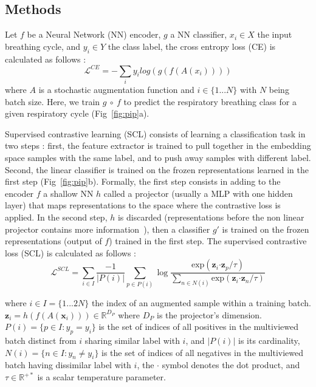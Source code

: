 \documentclass{article}
\begin{document}
\begin{sloppy}
\section{Methods}
\label{sec:methods}

Let $f$ be a Neural Network (NN) encoder, $g$ a NN classifier, $x_{i}\in X$ the input breathing cycle, and $y_{i}\in Y$ the class label, the cross entropy loss (CE) is calculated as follows :
\begin{equation}
\label{ce}
\mathcal{L}^{CE}  = - \sum_{i} y_{i} log(g(f(A(x_{i}))))
\end{equation}
where $A$ is a stochastic augmentation function and $i\in \{1...N\}$ with $N$ being batch size.
Here, we train ${g~\circ~f}$ to predict the respiratory breathing class for a given respiratory cycle (Fig~\ref{fig:pip}a).

Supervised contrastive learning (SCL) consists of learning a classification task in two steps : first, the feature extractor is trained to pull together in the embedding space samples with the same label, and to push away samples with different label. Second, the linear classifier is trained on the frozen representations learned in the first step (Fig~\ref{fig:pip}b). Formally, the first step consists in adding to the encoder $f$ a shallow NN $h$ called a projector (usually a MLP with one hidden layer) that maps representations to the space where the contrastive loss is applied. In the second step, $h$ is discarded (representations before the non linear projector contains more information~\cite{chen2020simple}), then a classifier $g'$ is trained on the frozen representations (output of $f$) trained in the first step. The supervised contrastive loss (SCL) is calculated as follows :
\begin{equation}
\label{scl}
\mathcal{L}^{SCL} = \sum_{i\in I}\frac{-1}{|P(i)|}\sum_{p\in P(i)}\log{\frac{\text{exp}\left(\boldsymbol{z}_i\boldsymbol{\cdot}\boldsymbol{z}_p/\tau\right)}{\sum\limits_{n\in N(i)}\text{exp}\left(\boldsymbol{z}_i\boldsymbol{\cdot}\boldsymbol{z}_n/\tau\right)}}
\end{equation}

where $i\in I=\{1...2 N\}$ the index of an augmented sample within a training batch.
$\boldsymbol{z}_{i}=h(f(A(\boldsymbol{x}_{i})))\in\mathbb{R}^{D_P}$ where ${D_P}$ is the projector's dimension. ${P(i)={\{p\in I:{{y}}_p={{y}}_i}\}}$ is the set of indices of all positives in the multiviewed batch distinct from $i$ sharing similar label with $i$, and $|P(i)|$ is its cardinality, ${N(i)={\{n\in I:{{y}}_n\neq{{y}}_i}\}}$ is the set of indices of all negatives in the multiviewed batch having dissimilar label with $i$, the $\boldsymbol{\cdot}$ symbol denotes the dot product, and $\tau\in\mathbb{R}^{+*}$ is a scalar temperature parameter.


\end{sloppy}
\end{document}
